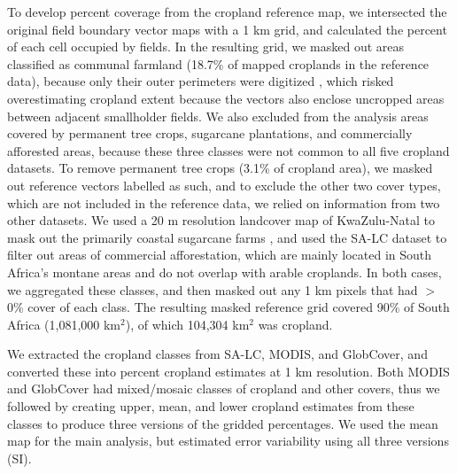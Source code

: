 \documentclass[a4paper]{article}
\begin{document}
To develop percent coverage from the cropland reference map, we intersected the original field boundary vector maps with a 1 km grid, and calculated the percent of each cell occupied by fields. In the resulting grid, we masked out areas classified as communal farmland (18.7\% of mapped croplands in the reference data), because only their outer perimeters were digitized \citep{fourie_better_2009}, which risked overestimating cropland extent because the vectors also enclose uncropped areas between adjacent smallholder fields. We also excluded from the analysis areas covered by permanent tree crops, sugarcane plantations, and commercially afforested areas, because these three classes were not common to all five cropland datasets. To remove permanent tree crops (3.1\% of cropland area), we masked out reference vectors labelled as such, and to exclude the other two cover types, which are not included in the reference data, we relied on information from two other datasets. We used a 20 m resolution landcover map of KwaZulu-Natal to mask out the primarily coastal sugarcane farms \citep[93-100\% user's and 76-98\% producer's accuracy for sugarcane classes;][]{geoterraimage_2011_2013}, and used the SA-LC dataset to filter out areas of commercial afforestation, which are mainly located in South Africa's montane areas and do not overlap with arable croplands. In both cases, we aggregated these classes, and then masked out any 1 km pixels that had $>$0\% cover of each class. The resulting masked reference grid covered 90\% of South Africa (1,081,000 km$^2$), of which 104,304 km$^2$ was cropland. 

We extracted the cropland classes from SA-LC, MODIS, and GlobCover, and converted these into percent cropland estimates at 1 km resolution. Both MODIS and GlobCover had mixed/mosaic classes of cropland and other covers, thus we followed \citet{fritz_mapping_2015} by creating upper, mean, and lower cropland estimates from these classes to produce three versions of the gridded percentages. We used the mean map for the main analysis, but estimated error variability using all three versions (SI).

\vspace{-0.3 cm}
\end{document}
